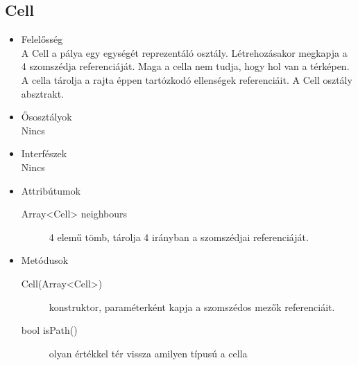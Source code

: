\subsection{Cell}
\begin{itemize}
\item Felelősség\\
A Cell a pálya egy egységét reprezentáló osztály. Létrehozásakor megkapja a 4 szomszédja referenciáját. Maga a cella nem tudja, hogy hol van a térképen. A cella tárolja a rajta éppen tartózkodó ellenségek referenciáit. A Cell osztály absztrakt.
\item Ősosztályok\\
Nincs
\item Interfészek\\
Nincs
\item Attribútumok\\
	\begin{description}
		\item[Array<Cell> neighbours] 4 elemű tömb, tárolja 4 irányban a szomszédjai referenciáját.

		
	\end{description}
\item Metódusok\\
	\begin{description}
		
		\item[Cell(Array<Cell>)] konstruktor, paraméterként kapja a szomszédos mezők referenciáit.
		\item[bool isPath()] olyan értékkel tér vissza amilyen típusú a cella 
		
		
	\end{description}
\end{itemize}

